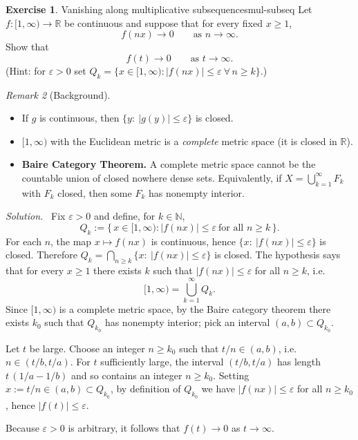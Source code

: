 \documentclass[11pt,a4paper]{article}
\theoremstyle{definition}
\newtheorem{exercise}{Exercise} %
\theoremstyle{definition}
\theoremstyle{plain}
\theoremstyle{remark}
\newtheorem{remark}[exercise]{Remark}
\newenvironment{solution}{\par\noindent\textit{Solution.}\ }{\par\vspace{0.5em}}
\begin{document}
\begin{exercise}{Vanishing along multiplicative subsequences}{mul-subseq}
	Let $f:[1,\infty)\to\mathbb{R}$ be continuous and suppose that for every fixed $x\ge1$,
	\[
	f(nx)\longrightarrow 0 \qquad\text{as }n\to\infty .
	\]
	Show that
	\[
	f(t)\longrightarrow 0 \qquad\text{as }t\to\infty .
	\]
	(Hint: for $\varepsilon>0$ set $Q_k=\{x\in[1,\infty): |f(nx)|\le\varepsilon\ \forall\,n\ge k\}$.)
\end{exercise}

\begin{remark}[Background]
	\begin{itemize}
		\item If $g$ is continuous, then $\{y:\ |g(y)|\le\varepsilon\}$ is closed.
		\item $[1,\infty)$ with the Euclidean metric is a \emph{complete} metric space
		(it is closed in $\mathbb R$).
		\item \textbf{Baire Category Theorem.}
		A complete metric space cannot be the countable union of closed nowhere dense sets.
		Equivalently, if $X=\bigcup_{k=1}^\infty F_k$ with $F_k$ closed, then some $F_k$
		has nonempty interior.
	\end{itemize}
\end{remark}

\begin{solution}
	Fix $\varepsilon>0$ and define, for $k\in\mathbb{N}$,
	\[
	Q_k:=\{\,x\in[1,\infty): |f(nx)|\le\varepsilon\ \text{for all } n\ge k\,\}.
	\]
	For each $n$, the map $x\mapsto f(nx)$ is continuous, hence
	$\{x:\ |f(nx)|\le\varepsilon\}$ is closed. Therefore $Q_k=\bigcap_{n\ge k}\{x:\ |f(nx)|\le\varepsilon\}$
	is closed. The hypothesis says that for every $x\ge1$ there exists $k$ such that
	$|f(nx)|\le\varepsilon$ for all $n\ge k$, i.e.
	\[
	[1,\infty)=\bigcup_{k=1}^\infty Q_k .
	\]
	Since $[1,\infty)$ is a complete metric space, by the Baire category theorem there exists
	$k_0$ such that $Q_{k_0}$ has nonempty interior; pick an interval $(a,b)\subset Q_{k_0}$.
	
	Let $t$ be large. Choose an integer $n\ge k_0$ such that $t/n\in(a,b)$, i.e.\ $n\in(t/b,t/a)$.
	For $t$ sufficiently large, the interval $(t/b,t/a)$ has length $t\,(1/a-1/b)$ and so contains
	an integer $n\ge k_0$. Setting $x:=t/n\in(a,b)\subset Q_{k_0}$, by definition of $Q_{k_0}$ we have
	$|f(nx)|\le\varepsilon$ for all $n\ge k_0$, hence $|f(t)|\le\varepsilon$.
	
	Because $\varepsilon>0$ is arbitrary, it follows that $f(t)\to 0$ as $t\to\infty$.
\end{solution}
\end{document}
